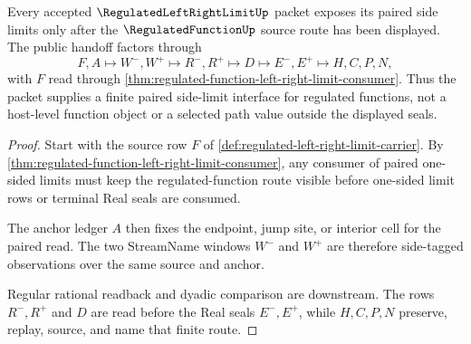 \begin{theorem}
\label{thm:regulated-left-right-limit-regulated-handoff}
Every accepted $\RegulatedLeftRightLimitUp$ packet exposes its paired side limits only after the $\RegulatedFunctionUp$ source route has been displayed. The public handoff factors through
$$
F,A \longmapsto W^-,W^+ \longmapsto R^-,R^+ \longmapsto D \longmapsto E^-,E^+ \longmapsto H,C,P,N,
$$
with $F$ read through \autoref{thm:regulated-function-left-right-limit-consumer}. Thus the packet supplies a finite paired side-limit interface for regulated functions, not a host-level function object or a selected path value outside the displayed seals.
\end{theorem}
\begin{proof}
Start with the source row $F$ of \autoref{def:regulated-left-right-limit-carrier}. By \autoref{thm:regulated-function-left-right-limit-consumer}, any consumer of paired one-sided limits must keep the regulated-function route visible before one-sided limit rows or terminal Real seals are consumed.

The anchor ledger $A$ then fixes the endpoint, jump site, or interior cell for the paired read. The two StreamName windows $W^-$ and $W^+$ are therefore side-tagged observations over the same source and anchor.

Regular rational readback and dyadic comparison are downstream. The rows $R^-,R^+$ and $D$ are read before the Real seals $E^-,E^+$, while $H,C,P,N$ preserve, replay, source, and name that finite route.
\end{proof}


